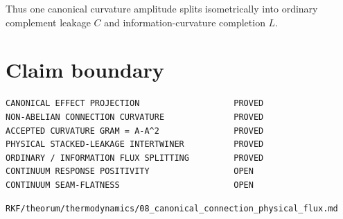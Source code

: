 Thus one canonical curvature amplitude splits isometrically into ordinary complement leakage \(C\) and information-curvature completion \(L\).

\hypertarget{claim-boundary}{%
\section{Claim boundary}\label{claim-boundary}}

\begin{verbatim}
CANONICAL EFFECT PROJECTION                   PROVED
NON-ABELIAN CONNECTION CURVATURE              PROVED
ACCEPTED CURVATURE GRAM = A-A^2               PROVED
PHYSICAL STACKED-LEAKAGE INTERTWINER          PROVED
ORDINARY / INFORMATION FLUX SPLITTING         PROVED
CONTINUUM RESPONSE POSITIVITY                 OPEN
CONTINUUM SEAM-FLATNESS                       OPEN
\end{verbatim}

\begin{flushright}\small\texttt{RKF/theorum/thermodynamics/08\_canonical\_connection\_physical\_flux.md}\end{flushright}
